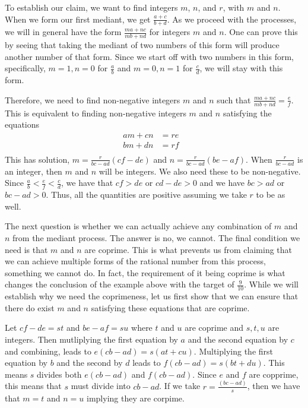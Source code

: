 \documentclass[12pt]{article}
\theoremstyle{remark}
\begin{document}
To establish our claim, we want to find integers $m$, $n$, and $r$, with $m$ and $n$. When we form our first mediant, we get $\frac{a+c}{b+d}$. As we proceed with the processes, we will in general have the form $\frac{ma + nc}{mb + nd}$ for integers $m$ and $n$. One can prove this by seeing that taking the mediant of two numbers of this form will produce another number of that form. Since we start off with two numbers in this form, specifically, $m=1, n=0$ for $\frac{a}{b}$ and $m=0, n=1$ for $\frac{c}{d}$, we will stay with this form. 

Therefore, we need to find non-negative integers $m$ and $n$ such that $\frac{ma+nc}{mb+nd} = \frac{e}{f}$. This is equivalent to finding non-negative integers $m$ and $n$
satisfying the equations
\begin{align*}
    am + cn &= re & \\
    bm + dn &= rf & \\
\end{align*}
This has solution, $m = \frac{r}{bc-ad} (cf-de)$ and $n= \frac{r}{bc-ad} (be-af)$. When $\frac{r}{bc-ad}$ is an integer, then $m$ and $n$ will be integers. We also need these to be non-negative. Since $\frac{a}{b} < \frac{e}{f} < \frac{c}{d}$, we have that $cf>de$ or $cd - de > 0$ and we have $bc>ad$ or $bc - ad > 0$. Thus, all the quantities are positive assuming we take $r$ to be as well. 

The next question is whether we can actually achieve any combination of $m$ and $n$ from the mediant process. The answer is no, we cannot. The final condition we need is that $m$ and $n$ are coprime. This is what prevents us from claiming that we can achieve multiple forms of the rational number from this process, something we cannot do. In fact, the requirement of it being coprime is what changes the conclusion of the example above with the target of $\frac{9}{10}$. While we will establish why we need the coprimeness, let us first show that we can ensure that there do exist $m$ and $n$ satisfying these equations that are coprime. 

Let $cf-de = st$ and $be-af = su$ where $t$ and $u$ are coprime and $s, t, u$ are integers.  Then mutliplying the first equation by $a$ and the second equation by $c$ and combining, leads to $e (cb -ad) = s (at  + cu)$. Multiplying the first equation by $b$ and the second by $d$ leads to $f (cb - ad) = s(bt + du)$. This means $s$ divides both $e(cb-ad)$ and $f(cb-ad)$. Since $e$ and $f$ are copprime, this means that $s$ must divide into $cb-ad$. If we take $r = \frac{(bc-ad)}{s}$, then we have that $m=t$ and $n=u$ implying they are corpime. 
\end{document}
